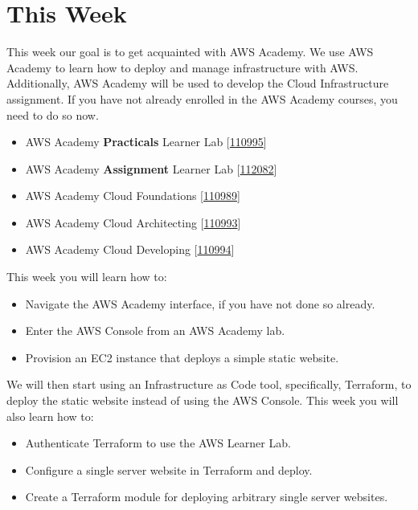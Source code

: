 \documentclass{csse4400}
\begin{document}
\section{This Week}
This week our goal is to get acquainted with AWS Academy.
We use AWS Academy to learn how to deploy and manage infrastructure with AWS.
Additionally, AWS Academy will be used to develop the Cloud Infrastructure assignment.
If you have not already enrolled in the AWS Academy courses, you need to do so now.
\begin{itemize}
    \item AWS Academy \textbf{Practicals} Learner Lab [\href{https://awsacademy.instructure.com/courses/110995}{110995}]
    \item AWS Academy \textbf{Assignment} Learner Lab [\href{https://awsacademy.instructure.com/courses/112082}{112082}]
    \item AWS Academy Cloud Foundations [\href{https://awsacademy.instructure.com/courses/110989}{110989}]
    \item AWS Academy Cloud Architecting [\href{https://awsacademy.instructure.com/courses/110993}{110993}]
    \item AWS Academy Cloud Developing [\href{https://awsacademy.instructure.com/courses/110994}{110994}]
\end{itemize}

\noindent
This week you will learn how to:
\begin{itemize}
    \item Navigate the AWS Academy interface, if you have not done so already.
    \item Enter the AWS Console from an AWS Academy lab.
    \item Provision an EC2 instance that deploys a simple static website.
\end{itemize}

\noindent
We will then start using an Infrastructure as Code tool,
specifically, Terraform,
to deploy the static website instead of using the AWS Console.
This week you will also learn how to:
\begin{itemize}
    \item Authenticate Terraform to use the AWS Learner Lab.
    \item Configure a single server website in Terraform and deploy.
    \item Create a Terraform module for deploying arbitrary single server websites.
\end{itemize}
\end{document}
